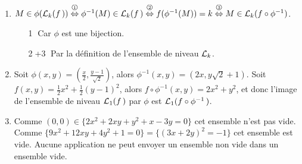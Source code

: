 \documentclass[a4paper,12pt,reqno]{amsart}
\begin{document}
\begin{solution}
  \newcommand\circled[1]{\textcircled{\scriptsize #1}}
  \newcommand\scriptcircled[1]{\raisebox{3pt}{\scriptsize\textcircled{\raisebox{-0.3pt}{\tiny #1}}}}

  \begin{enumerate}
    \item
      $ M \in \phi(\ens{L}_{k}(f\,)) \stackrel{\scriptcircled{1}}{\ssi}
        \phi^{-1}(M) \in \ens{L}_{k}(f\,) \stackrel{\scriptcircled{2}}{\ssi}
        f(\phi^{-1}(M))=k \stackrel{\scriptcircled{3}}{\ssi}
        M \in \ens{L}_{k}(f\circ\phi^{-1}) $.
    \begin{itemize}[leftmargin=!]
      \item[\circled{1}] Car $\phi$ est une bijection.
      \item[\circled{2}+\circled{3}] Par la définition de l'ensemble de niveau $\mathcal{L}_{k}$.
    \end{itemize}
    \item Soit $\phi(x,y)=(\frac{x}{2},\frac{y-1}{\sqrt{2}})$, alors $\phi^{-1}(x,y)=(2x,y\sqrt{2}+1)$. Soit $f(x,y)=\frac{1}{2} x^{2}+\frac{1}{2}(y-1)^{2}$, alors $f\circ \phi^{-1}(x,y)=2x^{2}+y^{2}$, et donc l'image de l'ensemble de niveau $\mathcal{L}_{1}(f\,)$ par $\phi$ est $\mathcal{L}_{1}(f\circ \phi^{-1}\,)$.
    \item Comme $(0,0)\in\{2x^{2}+2xy+y^{2}+x-3y=0\}$ cet ensemble n'est pas vide. Comme $\{9x^{2}+12xy+4y^{2}+1=0\}=\{(3x+2y)^{2}=-1\}$ cet ensemble est vide. Aucune application ne peut envoyer un ensemble non vide dans un ensemble vide.
  \end{enumerate}
\end{solution}
\end{document}
